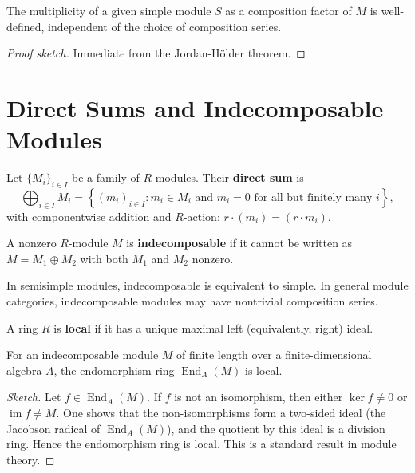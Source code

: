 \begin{cor}
The multiplicity of a given simple module $S$ as a composition factor of $M$ is well-defined, independent of the choice of composition series.
\end{cor}

\begin{proof}[Proof sketch]
Immediate from the Jordan-Hölder theorem.
\end{proof}

\section{Direct Sums and Indecomposable Modules}

\begin{defn}
Let $\{M_i\}_{i \in I}$ be a family of $R$-modules. Their \textbf{direct sum} is
\[
\bigoplus_{i \in I} M_i = \left\{ (m_i)_{i \in I} : m_i \in M_i \text{ and } m_i = 0 \text{ for all but finitely many } i \right\},
\]
with componentwise addition and $R$-action: $r \cdot (m_i) = (r \cdot m_i)$.
\end{defn}

\begin{defn}
A nonzero $R$-module $M$ is \textbf{indecomposable} if it cannot be written as $M = M_1 \oplus M_2$ with both $M_1$ and $M_2$ nonzero.
\end{defn}

\begin{remark}
In semisimple modules, indecomposable is equivalent to simple. In general module categories, indecomposable modules may have nontrivial composition series.
\end{remark}

\begin{defn}
A ring $R$ is \textbf{local} if it has a unique maximal left (equivalently, right) ideal.
\end{defn}

\begin{lemma}
For an indecomposable module $M$ of finite length over a finite-dimensional algebra $A$, the endomorphism ring $\operatorname{End}_A(M)$ is local.
\end{lemma}

\begin{proof}[Sketch]
Let $f \in \operatorname{End}_A(M)$. If $f$ is not an isomorphism, then either $\ker f \neq 0$ or $\operatorname{im} f \neq M$. One shows that the non-isomorphisms form a two-sided ideal (the Jacobson radical of $\operatorname{End}_A(M)$), and the quotient by this ideal is a division ring. Hence the endomorphism ring is local. This is a standard result in module theory.
\end{proof}

